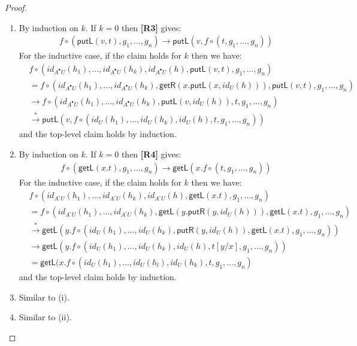 \documentclass[twoside,11pt,final]{entics}
\newcommand{\getl}{\mathsf{getL}}
\newcommand{\putr}{\mathsf{putR}}
\newcommand{\getr}{\mathsf{getR}}
\newcommand{\putl}{\mathsf{putL}}
\newcommand{\seq}{,\!\ldots\!,}
\begin{document}
\begin{proof}
  \begin{enumerate}
  \item By induction on $k$. If $k = 0$ then \textbf{[R3]} gives:
    \begin{align*}
      & f \circ (\putl(v,t),g_1 \seq g_n)
        \to \putl(v, f \circ (t,g_1 \seq g_n))
    \end{align*}
    For the inductive case, if the claim holds for $k$ then we have:
    \begin{align*}
      & f \circ (id_{A^\bullet U}(h_1) \seq id_{A^\bullet U}(h_k) , id_{A^\bullet U}(h) , \putl(v,t) , g_1 \seq g_n)
      \\& = f \circ (id_{A^\bullet U}(h_1) \seq id_{A^\bullet U}(h_k) , \getr(x.\putl(x, id_{U}(h))) , \putl(v,t) , g_1 \seq g_n)
      \\& \to f \circ (id_{A^\bullet U}(h_1) \seq id_{A^\bullet U}(h_k) , \putl(v, id_{U}(h)) , t , g_1 \seq g_n)
      \\& \stackrel{*}{\to} \putl(v, f \circ (id_{U}(h_1) \seq id_{U}(h_k) , id_{U}(h) , t , g_1 \seq g_n))
    \end{align*}
    and the top-level claim holds by induction.
  \item By induction on $k$. If $k = 0$ then \textbf{[R4]} gives:
    \begin{align*}
      & f \circ (\getl(x.t),g_1 \seq g_n) \to \getl(x.f \circ(t,g_1 \seq g_n))
    \end{align*}
    For the inductive case, if the claim holds for $k$ then we have:
    \begin{align*}
      & f \circ (id_{A^\circ U}(h_1) \seq id_{A^\circ U}(h_k) , id_{A^\circ U}(h) , \getl(x.t) , g_1 \seq g_n)
      \\& = f \circ (id_{A^\circ U}(h_1) \seq id_{A^\circ U}(h_k) , \getl(y.\putr(y, id_{U}(h))) , \getl(x.t) , g_1\seq g_n)
      \\& \stackrel{*}{\to} \getl(y.f \circ (id_{U}(h_1) \seq id_{U}(h_k) , \putr(y,id_{U}(h)) , \getl(x.t) , g_1 \seq g_n))
      \\& \to \getl(y. f \circ (id_{U}(h_1) \seq id_{U}(h_k) , id_{U}(h) , t[y/x] , g_1 \seq g_n))
      \\& = \getl(x. f \circ (id_{U}(h_1) \seq id_{U}(h_l) , id_{U}(h_k) , t , g_1 \seq g_n)
    \end{align*}
    and the top-level claim holds by induction.
  \item Similar to (i).
  \item Similar to (ii).
  \end{enumerate}
\end{proof}
\end{document}
